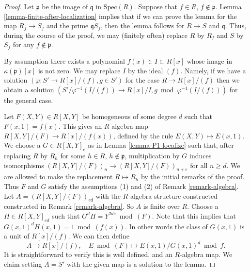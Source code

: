 \begin{proof}
Let $\mathfrak p$ be the image of $\mathfrak q$ in $\text{Spec}(R)$.
Suppose that $f \in R$, $f \not \in \mathfrak p$.
Lemma \ref{lemma-finite-after-localization} implies that if
we can prove the lemma for the map
$R_f \to S_f$ and the prime $\mathfrak qS_f$, then
the lemma follows for $R \to S$ and $\mathfrak q$.
Thus, during the course of the proof, we may (finitely often)
replace $R$ by $R_f$ and $S$ by $S_f$ for any
$f \not \in \mathfrak p$.

\medskip\noindent
By assumption there exists a polynomial $f(x) \in I \subset R[x]$
whose image in $\kappa(\mathfrak p)[x]$ is not zero. We may
replace $I$ by the ideal $(f)$. Namely, if we have a solution
$(\varphi : S' \to R[x]/(f), g \in S')$ for the case $R \to R[x]/(f)$
then we obtain a solution
$(S'/\varphi^{-1}(I/(f)) \to R[x]/I, g \bmod \varphi^{-1}(I/(f)))$
for the general case.

\medskip\noindent
Let $F(X, Y) \in R[X, Y]$ be homogeneous of some degree $d$ such that
$F(x, 1) = f(x)$. This gives an $R$-algebra map $R[X, Y]/(F) \to R[x]/(f(x))$,
defined by the rule $E(X, Y) \mapsto E(x, 1)$.
We choose a $G \in R[X, Y]_e$ as in Lemma \ref{lemma-P1-localize}
such that, after replacing $R$ by $R_h$ for some $h \in R$,
$h \not \in \mathfrak p$, multiplication by $G$ induces isomorphisms
$(R[X, Y]/(F))_n \to (R[X, Y]/(F))_{n + e}$ for
all $n \geq d$. We are allowed to make the replacement
$R \mapsto R_h$ by the initial remarks of the proof.
Thus $F$ and $G$ satisfy the assumptions (1) and (2) of Remark
\ref{remark-algebra}. Let $A = (R[X, Y]/(F))_{ed}$
with the $R$-algebra structure constructed
constructed in Remark \ref{remark-algebra}. So $A$ is finite over $R$.
Choose a $H \in R[X, Y]_{ed}$ such that $G^d H = Y^{2de} \bmod (F)$.
Note that this implies that $G(x, 1)^dH(x, 1) = 1 \bmod (f(x))$.
In other words the class of $G(x, 1)$ is a unit of $R[x]/(f)$.
We can then define
$$
A \longrightarrow R[x]/(f), \quad
E \bmod (F) \longmapsto E(x, 1)/G(x, 1)^d \bmod f.
$$
It is straightforward to verify this is well defined, and an
$R$-algebra map. We claim setting $A = S'$ with the given map
is a solution to the lemma.


\end{proof}
